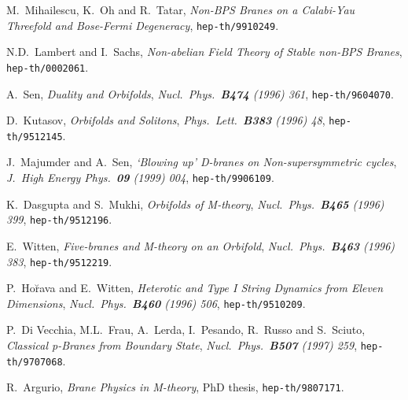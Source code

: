 \documentclass[12pt,a4paper]{article}
\begin{document}
\begin{thebibliography}{99}
M.~Mihailescu, K.~Oh and R.~Tatar, {\sl Non-BPS Branes on a Calabi-Yau
Threefold and Bose-Fermi Degeneracy}, {\tt hep-th/9910249}.

N.D.~Lambert and I.~Sachs, {\sl Non-abelian Field Theory of Stable
non-BPS Branes}, {\tt hep-th/0002061}.


A.~Sen, {\sl Duality and Orbifolds}, 
{\it Nucl.~Phys.~{\bf B474} (1996) 361}, {\tt hep-th/9604070}.

D.~Kutasov, {\sl Orbifolds and Solitons}, 
{\it Phys.~Lett.~{\bf B383} (1996) 48},
{\tt hep-th/9512145}.

J.~Majumder and A.~Sen, {\sl `Blowing up' D-branes on
Non-supersymmetric cycles}, {\it J.~High Energy Phys.~{\bf 09}
(1999) 004}, {\tt hep-th/9906109}.


K.~Dasgupta and S.~Mukhi, {\sl Orbifolds of M-theory},
{\it Nucl.~Phys.~{\bf B465} (1996) 399}, {\tt hep-th/9512196}.

E.~Witten, {\sl Five-branes and M-theory on an Orbifold},
{\it Nucl.~Phys.~{\bf B463} (1996) 383}, {\tt hep-th/9512219}.

P.~Ho\u{r}ava and E.~Witten, {\sl Heterotic and Type I String
Dynamics from Eleven Dimensions}, {\it Nucl.~Phys.~{\bf B460}
(1996) 506}, {\tt hep-th/9510209}.

P.~Di Vecchia, M.L.~Frau, A.~Lerda, I.~Pesando, R.~Russo
and S.~Sciuto, {\sl Classical p-Branes from Boundary State},
{\it Nucl.~Phys.~{\bf B507} (1997) 259}, {\tt hep-th/9707068}.


R.~Argurio, {\sl Brane Physics in M-theory}, PhD thesis,
{\tt hep-th/9807171}.




\end{thebibliography}
\end{document}
